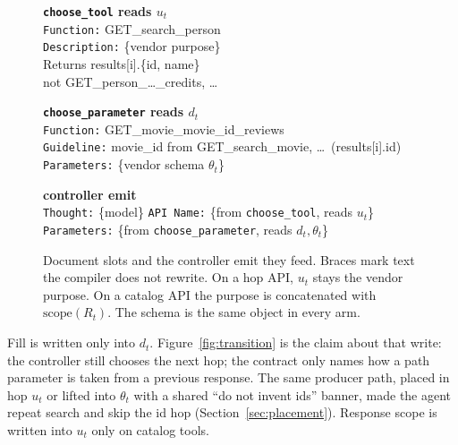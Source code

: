\documentclass[11pt,a4paper]{article}
\begin{document}
\begin{figure}[ht]
\centering
\begin{minipage}[t]{0.48\textwidth}
\begin{shaded}
\raggedright\footnotesize
\noindent\textbf{\texttt{choose\_tool} reads $u_t$}\\[0.2em]
\texttt{Function:} GET\_search\_person\\
\texttt{Description:} \{vendor purpose\}\\
Returns results[i].\{id, name\}\\
not GET\_person\_\ldots\_credits, \ldots
\end{shaded}
\end{minipage}\hfill
\begin{minipage}[t]{0.48\textwidth}
\begin{shaded}
\raggedright\footnotesize
\noindent\textbf{\texttt{choose\_parameter} reads $d_t$}\\[0.2em]
\texttt{Function:} GET\_movie\_movie\_id\_reviews\\
\texttt{Guideline:} movie\_id from GET\_search\_movie, \ldots\ (results[i].id)\\
\texttt{Parameters:} \{vendor schema $\theta_t$\}
\end{shaded}
\end{minipage}

\vspace{0.3em}
\begin{minipage}{0.98\textwidth}
\begin{shaded}
\raggedright\footnotesize
\noindent\textbf{controller emit}\\[0.2em]
\texttt{Thought:} \{model\}\quad
\texttt{API Name:} \{from \texttt{choose\_tool}, reads $u_t$\}\quad
\texttt{Parameters:} \{from \texttt{choose\_parameter}, reads $d_t,\theta_t$\}
\end{shaded}
\end{minipage}
\caption{Document slots and the controller emit they feed. Braces mark text the compiler does not rewrite. On a hop API, $u_t$ stays the vendor purpose. On a catalog API the purpose is concatenated with $\mathrm{scope}(R_t)$. The schema is the same object in every arm.}
\label{fig:slots}
\end{figure}

Fill is written only into $d_t$. Figure~\ref{fig:transition} is the claim about that write: the controller still chooses the next hop; the contract only names how a path parameter is taken from a previous response. The same producer path, placed in hop $u_t$ or lifted into $\theta_t$ with a shared ``do not invent ids'' banner, made the agent repeat search and skip the id hop (Section~\ref{sec:placement}). Response scope is written into $u_t$ only on catalog tools.
\end{document}
